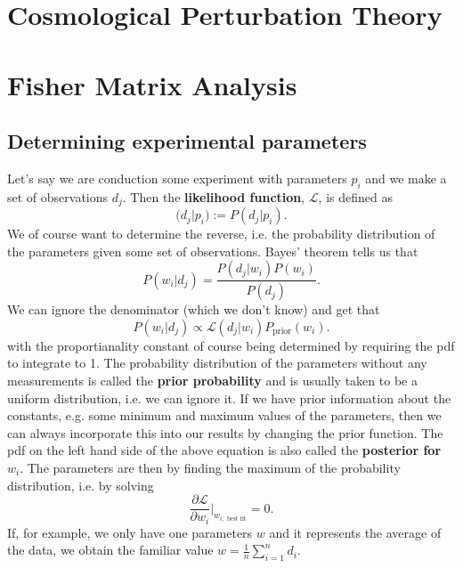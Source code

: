 \documentclass[11pt]{article} %
\begin{document}
\section{Cosmological Perturbation Theory}

\section{Fisher Matrix Analysis}
\subsection{Determining experimental parameters}
Let's say we are conduction some experiment with parameters $p_i$ and we make a set of observations $d_j$. Then the \textbf{likelihood function}, $\mathcal L$, is defined as
\begin{equation}
    \mathcal(d_j|p_i) := P(d_j|p_i).
\end{equation}
We of course want to determine the reverse, i.e. the probability distribution of the parameters given some set of observations. Bayes' theorem tells us that
\begin{equation}
    P(w_i|d_j)=\frac{P(d_j|w_i)P(w_i)}{P(d_j)}.
\end{equation}
We can ignore the denominator (which we don't know) and get that
\begin{equation}
    P(w_i|d_j)\propto\mathcal L (d_j|w_i)P_{\text{prior}}(w_i).
\end{equation}
with the proportianality constant of course being determined by requiring the pdf to integrate to 1. The probability distribution of the parameters without any measurements is called the \textbf{prior probability} and is usually taken to be a uniform distribution, i.e. we can ignore it. If we have prior information about the constants, e.g. some minimum and maximum values of the parameters, then we can always incorporate this into our results by changing the prior function. The pdf on the left hand side of the above equation is also called the \textbf{posterior for }$w_i$. The parameters are then by finding the maximum of the probability distribution, i.e. by solving
\begin{equation}
    \frac{\partial \mathcal L}{\partial w_i}|_{w_{i,\text{ best fit}}}=0.
\end{equation}
If, for example, we only have one parameters $w$ and it represents the average of the data, we obtain the familiar value $w=\frac{1}{n}\sum_{i=1}^n d_i$.
\end{document}
